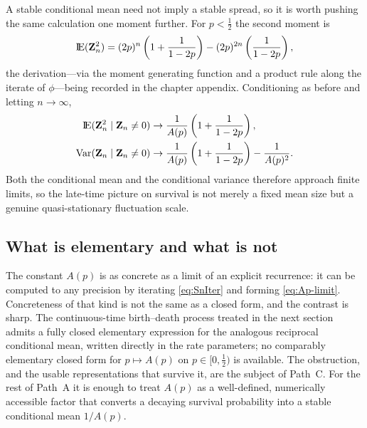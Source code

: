 A stable conditional mean need not imply a stable spread, so it is worth pushing the same calculation one moment further. For $p<\tfrac12$ the second moment is
\begin{equation}
\label{eq:secondMoment}
{\rm I}\!{\rm E}({\bf Z}_n^2)
=
(2p)^n\left(1+\frac{1}{1-2p}\right)
-
(2p)^{2n}\left(\frac{1}{1-2p}\right),
\end{equation}
the derivation---via the moment generating function and a product rule along the iterate of $\phi$---being recorded in the chapter appendix. Conditioning as before and letting $n\to\infty$,
\begin{align}
{\rm I}\!{\rm E}({\bf Z}_n^2\mid {\bf Z}_n\neq 0)
&\to
\frac{1}{A(p)}\left(1+\frac{1}{1-2p}\right),
\label{eq:cond-second}
\\
\mathrm{Var}({\bf Z}_n\mid {\bf Z}_n\neq 0)
&\to
\frac{1}{A(p)}\left(1+\frac{1}{1-2p}\right)
-
\frac{1}{A(p)^2}.
\label{eq:cond-var}
\end{align}
Both the conditional mean and the conditional variance therefore approach finite limits, so the late-time picture on survival is not merely a fixed mean size but a genuine quasi-stationary fluctuation scale.

\subsection{What is elementary and what is not}
\label{sec:punchline}

The constant $A(p)$ is as concrete as a limit of an explicit recurrence: it can be computed to any precision by iterating \eqref{eq:SnIter} and forming \eqref{eq:Ap-limit}. Concreteness of that kind is not the same as a closed form, and the contrast is sharp. The continuous-time birth--death process treated in the next section admits a fully closed elementary expression for the analogous reciprocal conditional mean, written directly in the rate parameters; no comparably elementary closed form for $p\mapsto A(p)$ on $p\in[0,\tfrac12)$ is available. The obstruction, and the usable representations that survive it, are the subject of Path~C. For the rest of Path~A it is enough to treat $A(p)$ as a well-defined, numerically accessible factor that converts a decaying survival probability into a stable conditional mean $1/A(p)$.
